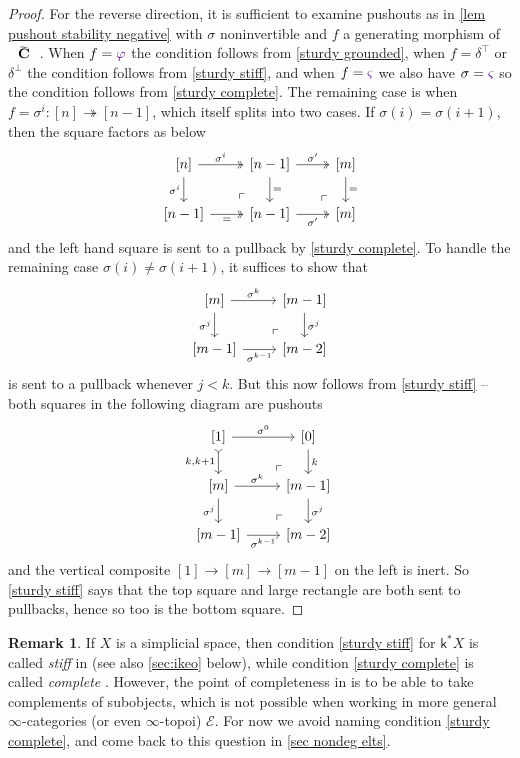 \documentclass{amsart}
\makeatletter
\newcommand{\contr}{\mathbf{C}}
\newcommand{\basecat}{\mathcal{E}}
\newcommand*\wt[1]{\mathpalette\wthelper{#1}}
\newcommand*\wthelper[2]{%
        \hbox{\dimen@\accentfontxheight#1%
                \accentfontxheight#11.3\dimen@
                $\m@th#1\widetilde{#2}$%
                \accentfontxheight#1\dimen@
        }%
}
\newcommand*\accentfontxheight[1]{%
        \fontdimen5\ifx#1\displaystyle
                \textfont
        \else\ifx#1\textstyle
                \textfont
        \else\ifx#1\scriptstyle
                \scriptfont
        \else
                \scriptscriptfont
        \fi\fi\fi3
}
\newcommand{\Tcontr}{\wt\contr}
\newcommand{\sigr}{{\color{Indigo}\varphi}}
\newcommand{\sigl}{{\color{Indigo}\varsigma}}
\newcommand{\lilk}{\mathsf{k}}
\theoremstyle{definition}
\newtheorem{remark}[theorem]{Remark}
\theoremstyle{noname}
\makeatother
\begin{document}
\begin{proof}
For the reverse direction, it is sufficient to examine pushouts as in \cref{lem pushout stability negative} with $\sigma$ noninvertible and $f$ a generating morphism of $\Tcontr$.
When $f= \sigr$ the condition follows from \eqref{sturdy grounded}, when $f = \delta^\top$ or $\delta^\bot$ the condition follows from \eqref{sturdy stiff}, and when $f=\sigl$ we also have $\sigma = \sigl$ so the condition follows from \eqref{sturdy complete}.
The remaining case is when $f = \sigma^i \colon [n] \twoheadrightarrow [n-1]$, which itself splits into two cases.
If $\sigma(i) = \sigma(i+1)$, then the square factors as below
\[
\begin{tikzcd}
{[n]} \rar[two heads, "\sigma^i"] \dar[swap]{\sigma^i} \drar[phantom, "\ulcorner"very near end] & {[n-1]} \rar[two heads,"\sigma'"] \dar{=}  \drar[phantom, "\ulcorner"very near end] & {[m]} \dar{=}
\\
{[n-1]} \rar[two heads, "="'] & {[n-1]} \rar[two heads, "\sigma'"'] & {[m]}
\end{tikzcd}
\]
and the left hand square is sent to a pullback by \eqref{sturdy complete}.
To handle the remaining case $\sigma(i) \neq \sigma(i+1)$, it suffices to show that 
\[ \begin{tikzcd}
{[m]} \rar{\sigma^k} \dar["\sigma^j"'] \drar[phantom, "\ulcorner" very near end] & {[m-1]} \dar["\sigma^j"] \\
{[m-1]} \rar["\sigma^{k-1}"'] & {[m-2]}
\end{tikzcd} \]
is sent to a pullback whenever $j < k$.
But this now follows from \eqref{sturdy stiff} --
both squares in the following diagram are pushouts 
\[ \begin{tikzcd}
{[1]} \rar{\sigma^0} \dar[tail,"{k,k+1}"'] \drar[phantom, "\ulcorner" very near end] & {[0]} \dar{k}
\\
{[m]} \rar{\sigma^k} \dar["\sigma^j"'] \drar[phantom, "\ulcorner" very near end] & {[m-1]} \dar["\sigma^j"] \\
{[m-1]} \rar["\sigma^{k-1}"'] & {[m-2]}
\end{tikzcd} \]
and the vertical composite $[1] \to [m] \to [m-1]$ on the left is inert.
So \eqref{sturdy stiff} says that the top square and large rectangle are both sent to pullbacks, hence so too is the bottom square.
\end{proof}

\begin{remark}\label{remark stiff complete}
If $X$ is a simplicial space, then condition \eqref{sturdy stiff} for $\lilk^*X$ is called \emph{stiff} in \cite[\S4]{GKT2} (see also \cref{sec:ikeo} below), while condition \eqref{sturdy complete} is called \emph{complete} \cite[\S2.7]{GKT2}.
However, the point of completeness in \cite{GKT2} is to be able to take complements of subobjects, which is not possible when working in more general $\infty$-categories (or even $\infty$-topoi) $\basecat$.
For now we avoid naming condition \eqref{sturdy complete}, and come back to this question in \cref{sec nondeg elts}.
\end{remark}
\end{document}

